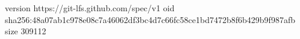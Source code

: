 version https://git-lfs.github.com/spec/v1
oid sha256:48a07ab1c978e08c7a46062df3bc4d7c66fc58ce1bd7472b8f6b429b9f987afb
size 309112
